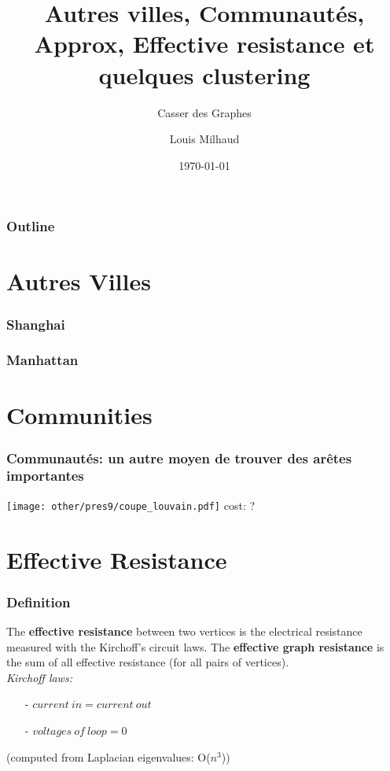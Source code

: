 \documentclass[aspectratio=169]{beamer}
\title{Autres villes, Communautés, Approx, Effective resistance et quelques clustering}
\subtitle{Casser des Graphes}
\author{Louis Milhaud}
\institute{Complex Networks - LIP6}
\date{\today}
\begin{document}
    \begin{frame}
        \titlepage
    \end{frame}

    \begin{frame}
        \frametitle{Outline}
        \tableofcontents
    \end{frame}

    \section{Autres Villes}
    \begin{frame}
        \frametitle{Shanghai}
    
        
    
    \end{frame}

    \begin{frame}
        \frametitle{Manhattan}
    
        
    
    \end{frame}
    \section{Communities}
    \begin{frame}
        \frametitle{Communautés: un autre moyen de trouver des arêtes importantes}
        \centering
        \texttt{[image: other/pres9/coupe\_louvain.pdf]}
        cost: ?
    \end{frame}

    \section{Effective Resistance}
    \begin{frame}
        \frametitle{Definition}
            The \textbf{effective resistance} between two vertices is the electrical resistance measured with the Kirchoff's circuit laws. The \textbf{effective graph resistance} is the sum of all effective resistance (for all pairs of vertices).
            \vspace{10pt}\\
            \emph{Kirchoff laws:}
            \begin{itemize}
                \item[-] $current\ in = current\ out$
                \item[-] $voltages\ of\ loop = 0 $
            \end{itemize}
            (computed from Laplacian eigenvalues: O($n^3$))
    \end{frame}
    
\end{document}
